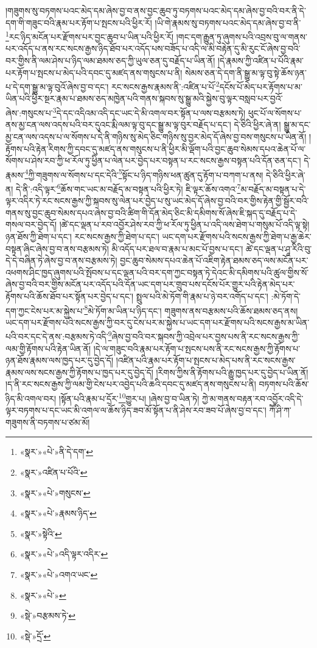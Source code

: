 །གཟུགས་སུ་བཏགས་པའང་མེད་དམ་ཞེས་བྱ་བ་ནས་བྱང་ཆུབ་ཏུ་བཏགས་པའང་མེད་དམ་ཞེས་བྱ་བའི་བར་ནི་དེ་དག་གི་གཟུང་བའི་རྣམ་པར་རྟོག་པ་སྤངས་པའི་ཕྱིར་རོ། །ཡི་གེ་རྣམས་སུ་བཏགས་པའང་མེད་དམ་ཞེས་བྱ་བ་ནི་\footnote{«སྣར་»«པེ་»ནི་དེ་དག་}རང་ཉིད་མངོན་པར་རྫོགས་པར་བྱང་ཆུབ་པ་ཡིན་པའི་ཕྱིར་རོ། །གང་དག་རྒྱུན་ཏུ་ཞུགས་པའི་འབྲས་བུ་ལ་གནས་པར་འདོད་པ་ནས་རང་སངས་རྒྱས་ཉིད་ཐོབ་པར་འདོད་པས་བཟོད་པ་འདི་ལ་མི་བརྟེན་དུ་མི་རུང་ངོ་ཞེས་བྱ་བའི་བར་གྱིས་ནི་ལམ་ཤེས་པ་ཉིད་ལམ་ཐམས་ཅད་ཀྱི་ཡུལ་ཅན་དུ་བརྗོད་པ་ཡིན་ནོ། །དེ་རྣམས་ཀྱི་འཛིན་པ་པོའི་རྣམ་པར་རྟོག་པ་སྤངས་པ་མེད་པའི་དབང་དུ་མཛད་ནས་གསུངས་པ་ནི། སེམས་ཅན་དེ་དག་ནི་སྒྱུ་མ་ལྟ་བུ་སྟེ་ཆོས་ཉན་པ་དེ་དག་སྒྱུ་མ་ལྟ་བུའོ་ཞེས་བྱ་བ་དང་། རང་སངས་རྒྱས་རྣམས་ནི་:འཛིན་པ་པོ་\footnote{«སྣར་»འཛིན་པ་པོའི་}དངོས་པོ་མེད་པར་རྟོགས་པ་མ་ཡིན་པའི་ཕྱིར་སྔར་རྣམ་པ་ཐམས་ཅད་མཁྱེན་པའི་གནས་སྐབས་སུ་སྒྱུ་མའི་སྐྱེས་བུ་ལྟར་བསླབ་པར་བྱའོ་ཞེས་:གསུངས་པ་\footnote{«སྣར་»«པེ་»གསུངས་}དེ་དང་འདིའམ་འདི་དང་ཡང་དེ་མི་འགལ་བར་སྟོན་པ་ལས་བརྩམས་ཏེ། ཕུང་པོ་ལ་སོགས་པ་ནས་མྱ་ངན་ལས་འདས་པའི་བར་དུའང་རྨི་ལམ་ལྟ་བུ་དང་སྒྱུ་མ་ལྟ་བུར་བརྗོད་པ་དང་། དེ་ཅིའི་ཕྱིར་ཞེ་ན། སྒྱུ་མ་དང་མྱ་ངན་ལས་འདས་པ་ལ་སོགས་པ་དེ་ནི་གཉིས་སུ་མེད་ཅིང་གཉིས་སུ་བྱར་མེད་དོ་ཞེས་བྱ་བས་གསུངས་པ་ཡིན་ནོ། །རྟོགས་པའི་རྟེན་རིགས་ཀྱི་དབང་དུ་མཛད་ནས་གསུངས་པ་ནི་ཕྱིར་མི་ལྡོག་པའི་བྱང་ཆུབ་སེམས་དཔའ་ཆེན་པོ་ལ་སོགས་པ་ཤེས་རབ་ཀྱི་ཕ་རོལ་ཏུ་ཕྱིན་པ་ལེན་པར་བྱེད་པར་བསྟན་པ་རང་སངས་རྒྱས་བསྟན་པའི་དོན་ཅན་དང་། དེ་རྣམས་\footnote{«སྣར་»«པེ་»རྣམས་ཉིད་}ཀྱི་གཟུགས་ལ་སོགས་པ་དང་དེའི་\footnote{«སྣར་»སྟེའི་}སྟོང་པ་ཉིད་གཉིས་ཕན་ཚུན་དུ་རྟོག་པ་བཀག་པ་ནས། དེ་ཅིའི་ཕྱིར་ཞེ་ན། དེ་ནི་:འདི་ལྟར་\footnote{«སྣར་»«པེ་»འདི་ལྟར་འདིར་}ཆོས་གང་ཡང་མ་བརྗོད་མ་བསྟན་པའི་ཕྱིར་ཏེ། ཇི་ལྟར་ཆོས་འགའ་\footnote{«སྣར་»«པེ་»འགའ་ཡང་}མ་བརྗོད་མ་བསྟན་པ་དེ་ལྟར་འདིར་ཏེ་རང་སངས་རྒྱས་ཀྱི་སྐབས་སུ་ལེན་པར་བྱེད་པ་སུ་ཡང་མེད་དོ་ཞེས་བྱ་བའི་བར་གྱིས་རྟེན་གྱི་སྦྱོར་བའི་གནས་སུ་བྱང་ཆུབ་སེམས་དཔའ་ཞེས་བྱ་བའི་ཚིག་གི་དོན་མེད་ཅིང་མི་དམིགས་སོ་ཞེས་ཇི་སྐད་དུ་བརྗོད་པ་དེ་གསལ་བར་བྱེད་དོ། །ཚེ་དང་ལྡན་པ་རབ་འབྱོར་ཤེས་རབ་ཀྱི་ཕ་རོལ་ཏུ་ཕྱིན་པ་འདི་ལས་ཐེག་པ་གསུམ་པོ་འདི་ལྟ་སྟེ། ཉན་ཐོས་ཀྱི་ཐེག་པ་དང་། རང་སངས་རྒྱས་ཀྱི་ཐེག་པ་དང་། ཡང་དག་པར་རྫོགས་པའི་སངས་རྒྱས་ཀྱི་ཐེག་པ་རྒྱ་ཆེར་བསྟན་ཞིང་ཞེས་བྱ་བ་ནས་བརྩམས་ཏེ། མི་འདོད་པར་ཐལ་བ་རྣམ་པ་མང་པོ་བྱས་པ་དང་། ཚེ་དང་ལྡན་པ་ཤཱ་རིའི་བུ་དེ་དེ་བཞིན་ཏེ་ཞེས་བྱ་བ་ནས་བརྩམས་ཏེ། བྱང་ཆུབ་སེམས་དཔའ་ཆེན་པོ་འཇིག་རྟེན་ཐམས་ཅད་ལས་མངོན་པར་འཕགས་ཤིང་ཁྱད་ཞུགས་པའི་སྤོབས་པ་དང་ལྡན་པའི་བར་དག་ཀྱང་བསྟན་ཏེ་དེའང་མི་དམིགས་པའི་ཚུལ་གྱིས་སོ་ཞེས་བྱ་བའི་བར་གྱིས་མངོན་པར་འདོད་པའི་དོན་ཡང་དག་པར་གྲུབ་པས་དངོས་པོར་གྱུར་པའི་རྟེན་མེད་པར་རྟོགས་པའི་ཆོས་ཐོབ་པར་སྟོན་པར་བྱེད་པ་དང་། སྤྲུལ་པའི་མེ་ཏོག་གི་རྣམ་པ་ཉེ་བར་འགོད་པ་དང་། :མེ་ཏོག་དེ་དག་ཀྱང་ངེས་པར་མ་སྐྱེས་པ་\footnote{«སྣར་»«པེ་»}མེ་ཏོག་མ་ཡིན་པ་ཉིད་དང་། གཟུགས་ནས་བརྩམས་པའི་ཆོས་ཐམས་ཅད་ནས། ཡང་དག་པར་རྫོགས་པའི་སངས་རྒྱས་ཀྱི་བར་དུ་ངེས་པར་མ་སྐྱེས་པ་ཡང་དག་པར་རྫོགས་པའི་སངས་རྒྱས་མ་ཡིན་པའི་བར་དང་དེ་ནས་:བརྩམས་ཏེ་འདི་\footnote{«སྡེ་»བརྩམས་ཏེ་}ཞེས་བྱ་བའི་བར་སྐབས་ཀྱི་འབྲེལ་པར་བྱས་པས་ནི་རང་སངས་རྒྱས་ཀྱི་ལམ་གྱི་རྟོགས་པའི་རྟེན་ཡིན་ནོ། །དེ་ལ་གཟུང་བའི་རྣམ་པར་རྟོག་པ་སྤངས་པས་ནི་རང་སངས་རྒྱས་ཀྱི་རྟོགས་པ་ཉན་ཐོས་རྣམས་ལས་ཁྱད་པར་དུ་བྱེད་དོ། །འཛིན་པའི་རྣམ་པར་རྟོག་པ་སྤངས་པ་མེད་པས་ནི་རང་སངས་རྒྱས་རྣམས་ལས་སངས་རྒྱས་ཀྱི་རྟོགས་པ་ཁྱད་པར་དུ་བྱེད་དོ། །རིགས་ཀྱིས་ནི་རྟོགས་པའི་རྒྱུ་ཁྱད་པར་དུ་བྱེད་པ་ཡིན་ནོ། །ད་ནི་རང་སངས་རྒྱས་ཀྱི་ལམ་གྱི་ངེས་པར་འབྱེད་པའི་ཆའི་དབང་དུ་མཛད་ནས་གསུངས་པ་ནི། བཏགས་པའི་ཆོས་ཉིད་མི་འགལ་བར། །སྟོན་པའི་རྣམ་པ་དྲོར་\footnote{«སྡེ་»དྲོ་}གྱུར་པ། །ཞེས་བྱ་བ་ཡིན་ཏེ། ཀྱེ་མ་གནས་བརྟན་རབ་འབྱོར་འདི་དེ་ལྟར་བཏགས་པ་དང་ཡང་མི་འགལ་ལ་ཆོས་ཉིད་ཟབ་མོ་སྟོན་པ་ནི་ཤེས་རབ་ཟབ་པོ་ཞེས་བྱ་བ་དང་། ཀཽ་ཤི་ཀ་གཟུགས་ནི་བཏགས་པ་ཙམ་མོ། 